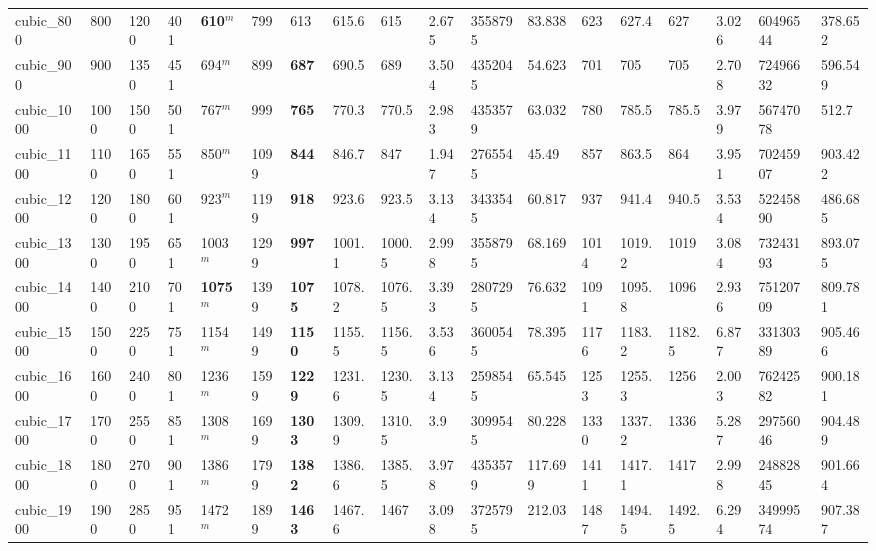 \begin{table}[h!]
{\begin{tabular}{llllllllllllllllll}
            cubic\_800 & 800 & 1200 & 401 & \textbf{610}$^{m}$ & 799 & 613 & 615.6 & 615 & 2.675 & 3558795 & 83.838 & 623 & 627.4 & 627 & 3.026 & 60496544 & 378.652 \\
            cubic\_900 & 900 & 1350 & 451 & 694$^{m}$ & 899 & \textbf{687} & 690.5 & 689 & 3.504 & 4352045 & 54.623 & 701 & 705 & 705 & 2.708 & 72496632 & 596.549 \\
            cubic\_1000 & 1000 & 1500 & 501 & 767$^{m}$ & 999 & \textbf{765} & 770.3 & 770.5 & 2.983 & 4353579 & 63.032 & 780 & 785.5 & 785.5 & 3.979 & 56747078 & 512.7 \\
            cubic\_1100 & 1100 & 1650 & 551 & 850$^{m}$ & 1099 & \textbf{844} & 846.7 & 847 & 1.947 & 2765545 & 45.49 & 857 & 863.5 & 864 & 3.951 & 70245907 & 903.422 \\
            cubic\_1200 & 1200 & 1800 & 601 & 923$^{m}$ & 1199 & \textbf{918} & 923.6 & 923.5 & 3.134 & 3433545 & 60.817 & 937 & 941.4 & 940.5 & 3.534 & 52245890 & 486.685 \\
            cubic\_1300 & 1300 & 1950 & 651 & 1003$^{m}$ & 1299 & \textbf{997} & 1001.1 & 1000.5 & 2.998 & 3558795 & 68.169 & 1014 & 1019.2 & 1019 & 3.084 & 73243193 & 893.075 \\
            cubic\_1400 & 1400 & 2100 & 701 & \textbf{1075}$^{m}$ & 1399 & \textbf{1075} & 1078.2 & 1076.5 & 3.393 & 2807295 & 76.632 & 1091 & 1095.8 & 1096 & 2.936 & 75120709 & 809.781 \\
            cubic\_1500 & 1500 & 2250 & 751 & 1154$^{m}$ & 1499 & \textbf{1150} & 1155.5 & 1156.5 & 3.536 & 3600545 & 78.395 & 1176 & 1183.2 & 1182.5 & 6.877 & 33130389 & 905.466 \\
            cubic\_1600 & 1600 & 2400 & 801 & 1236$^{m}$ & 1599 & \textbf{1229} & 1231.6 & 1230.5 & 3.134 & 2598545 & 65.545 & 1253 & 1255.3 & 1256 & 2.003 & 76242582 & 900.181 \\
            cubic\_1700 & 1700 & 2550 & 851 & 1308$^{m}$ & 1699 & \textbf{1303} & 1309.9 & 1310.5 & 3.9 & 3099545 & 80.228 & 1330 & 1337.2 & 1336 & 5.287 & 29756046 & 904.489 \\
            cubic\_1800 & 1800 & 2700 & 901 & 1386$^{m}$ & 1799 & \textbf{1382} & 1386.6 & 1385.5 & 3.978 & 4353579 & 117.699 & 1411 & 1417.1 & 1417 & 2.998 & 24882845 & 901.664 \\
            cubic\_1900 & 1900 & 2850 & 951 & 1472$^{m}$ & 1899 & \textbf{1463} & 1467.6 & 1467 & 3.098 & 3725795 & 212.03 & 1487 & 1494.5 & 1492.5 & 6.294 & 34999574 & 907.387 \\

\end{tabular}}
\end{table}
